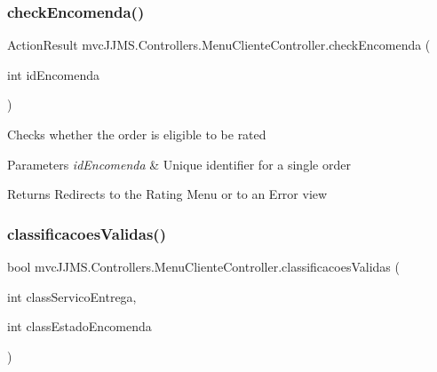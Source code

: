 \subsubsection{\texorpdfstring{check\+Encomenda()}{checkEncomenda()}}
{\footnotesize\ttfamily Action\+Result mvc\+J\+J\+M\+S.\+Controllers.\+Menu\+Cliente\+Controller.\+check\+Encomenda (\begin{DoxyParamCaption}\item[{int}]{id\+Encomenda }\end{DoxyParamCaption})\hspace{0.3cm}{\ttfamily [inline]}}



Checks whether the order is eligible to be rated 


\begin{DoxyParams}{Parameters}
{\em id\+Encomenda} & Unique identifier for a single order\\
\hline
\end{DoxyParams}
\begin{DoxyReturn}{Returns}
Redirects to the Rating Menu or to an Error view
\end{DoxyReturn}
\mbox{\label{classmvc_j_j_m_s_1_1_controllers_1_1_menu_cliente_controller_af0c08fdfd46b358fce2002e705daba6b}} 
\subsubsection{\texorpdfstring{classificacoes\+Validas()}{classificacoesValidas()}}
{\footnotesize\ttfamily bool mvc\+J\+J\+M\+S.\+Controllers.\+Menu\+Cliente\+Controller.\+classificacoes\+Validas (\begin{DoxyParamCaption}\item[{int}]{class\+Servico\+Entrega,  }\item[{int}]{class\+Estado\+Encomenda }\end{DoxyParamCaption})\hspace{0.3cm}{\ttfamily [inline]}}



